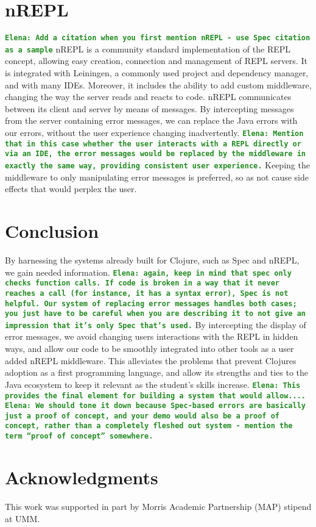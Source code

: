 \documentclass[12pt]{article}
\newcommand{\comment}[1]{{\bf \tt  {#1}}}
\newcommand{\emcomment}[1]{\textcolor{ForestGreen}{\comment{Elena: {#1}}}}
\begin{document}
\section{nREPL}
\emcomment{Add a citation when you first mention nREPL - use Spec citation as a sample}
nREPL is a community standard implementation of the REPL concept,
allowing easy creation, connection and management of REPL servers.
It is integrated with Leiningen, a commonly used project and dependency manager,
 and with many IDEs. Moreover, it includes the ability to add custom middleware,
  changing the way the server reads and reacts to code.
 nREPL communicates between its client and server by means of messages.
 By intercepting messages from the server containing error messages,
 we can replace the Java errors with our errors,
  without the user experience changing inadvertently.
\emcomment{Mention that in this case whether the user interacts with a REPL directly or via an IDE,
the error messages would be replaced by the middleware in exactly the same way, providing consistent
user experience.}
  Keeping the middleware to only manipulating error messages
  is preferred, so as not cause side effects that would perplex the user.

\section{Conclusion}
By harnessing the systems already built for Clojure,
such as Spec and nREPL, we gain needed information.
\emcomment{again, keep in mind that spec only checks function calls. If code is broken
in a way that it never reaches a call (for instance, it has a syntax error), Spec is not helpful.
Our system of replacing error messages handles both cases; you just have to be careful
when you are describing it to not give an impression that it's only Spec that's used.}
By intercepting the display of error messages, we avoid changing users
interactions with the REPL in hidden ways, and allow our code to
be smoothly integrated into other tools as a user added nREPL middleware.
  This alleviates the problems that prevent Clojures
 adoption as a first programming language, and allow its strengths
 and ties to the Java ecosystem to keep it relevant as the student's skills increase.
\emcomment{This provides the final element for building a system that would allow....}
\emcomment{We should tone it down because Spec-based errors are basically just a proof of concept,
and your demo would also be a proof of concept, rather than a completely fleshed out system - mention the term ``proof of concept'' somewhere.}





\section{Acknowledgments}
This work was supported in part by Morris Academic Partnership (MAP) stipend at UMM.




\end{document}
